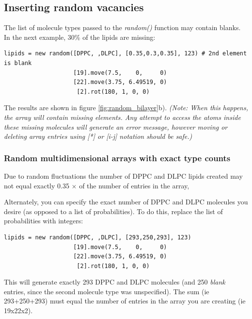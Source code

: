 \documentclass[11pt]{article}
\begin{document}
\subsection{Inserting random vacancies}
\label{sec:random_vacancies}
The list of molecule types passed to the \mbox{\textit{random()}} function
may contain blanks.  In the next example, 30\% of the lipids are missing:
\begin{verbatim}
lipids = new random([DPPC, ,DLPC], [0.35,0.3,0.35], 123) # 2nd element is blank
                    [19].move(7.5,    0,     0)
                    [22].move(3.75, 6.49519, 0)
                     [2].rot(180, 1, 0, 0)     
\end{verbatim}
The results are shown in figure \ref{fig:random_bilayer}b).
\textit{(Note: When this happens, the array will contain missing elements.
 Any attempt to access the atoms inside these missing molecules will
 generate an error message, 
 however moving or deleting array entries 
 using [*] or [i-j] notation should be safe.)}

\subsubsection{Random multidimensional arrays with exact type counts}
\label{sec:random_multidim_exact}
Due to random fluctuations the number of DPPC and DLPC lipids created 
may not equal exactly 0.35 $\times$ of the number of entries in the array,

Alternately, you can specify the exact number of DPPC and DLPC molecules
you desire (as opposed to a list of probabilities).
To do this, replace the list of probabilities with integers:
\begin{verbatim}
lipids = new random([DPPC, ,DLPC], [293,250,293], 123)
                    [19].move(7.5,    0,     0)
                    [22].move(3.75, 6.49519, 0)
                     [2].rot(180, 1, 0, 0)     
\end{verbatim}
This will generate exactly 293 DPPC and DLPC molecules
(and 250 \textit{blank} entries, 
since the second molecule type was unspecified).
The sum (ie 293+250+293) must equal the number of entries in the 
array you are creating (ie 19x22x2).
\end{document}
